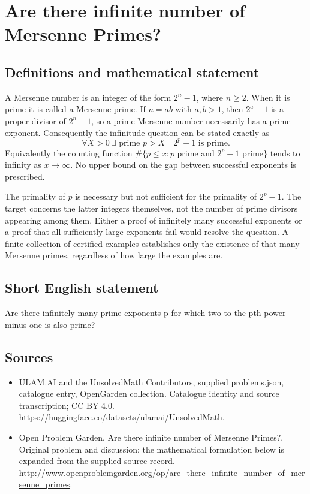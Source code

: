 \documentclass[11pt,a4paper]{article}
\begin{document}
\section*{Are there infinite number of Mersenne Primes?}\label{statement}

\subsection{Definitions and mathematical statement}
A Mersenne number is an integer of the form $2^n-1$, where $n\ge2$.
When it is prime it is called a Mersenne prime. If $n=ab$ with
$a,b>1$, then $2^a-1$ is a proper divisor of $2^n-1$, so a prime
Mersenne number necessarily has a prime exponent. Consequently the
infinitude question can be stated exactly as
\[
 \forall X>0\ \exists\text{ prime }p>X\quad 2^p-1\text{ is prime}.
\]
Equivalently the counting function
$\#\{p\le x:p\text{ prime and }2^p-1\text{ prime}\}$ tends to
infinity as $x\to\infty$. No upper bound on the gap between successful
exponents is prescribed.

The primality of $p$ is necessary but not sufficient for the primality
of $2^p-1$. The target concerns the latter integers themselves, not
the number of prime divisors appearing among them. Either a proof of
infinitely many successful exponents or a proof that all sufficiently
large exponents fail would resolve the question. A finite collection
of certified examples establishes only the existence of that many
Mersenne primes, regardless of how large the examples are.
\subsection{Short English statement}
Are there infinitely many prime exponents p for which two to the pth power minus one is also prime?
\subsection{Sources}
\begin{itemize}
\item[S1] ULAM.AI and the UnsolvedMath Contributors, supplied problems.json, catalogue entry, OpenGarden collection. Catalogue identity and source transcription; CC BY 4.0.
\url{https://huggingface.co/datasets/ulamai/UnsolvedMath}.
\item[S2] Open Problem Garden, Are there infinite number of Mersenne Primes?. Original problem and discussion; the mathematical formulation below is expanded from the supplied source record.
\url{http://www.openproblemgarden.org/op/are_there_infinite_number_of_mersenne_primes}.
\end{itemize}
\end{document}
